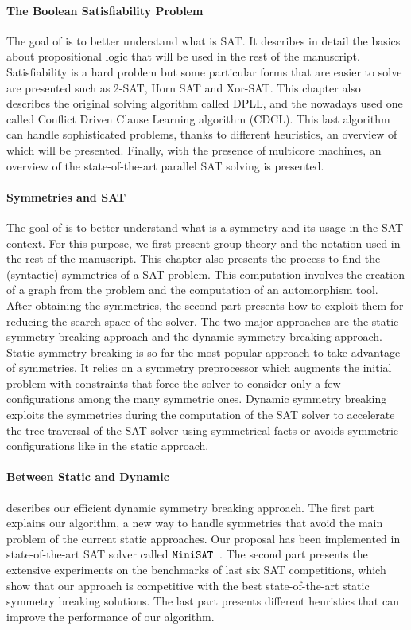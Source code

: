 \paragraph{The Boolean Satisfiability Problem}
The goal of  is to better understand what is SAT. 
It describes in detail the basics
about propositional logic that will be used in the rest of the manuscript. Satisfiability is a hard
problem but some particular forms that are easier to solve are presented such as 2-SAT, Horn SAT and Xor-SAT.
This chapter also describes the original solving algorithm called DPLL, and the
nowadays used one called Conflict Driven Clause Learning algorithm (CDCL).
This last algorithm can handle sophisticated problems, thanks to different heuristics, 
an overview of which will be presented. Finally, with the presence of multicore machines, an overview
 of the state-of-the-art parallel SAT solving is presented.

\paragraph{Symmetries and SAT}
The goal of  is to better understand what is a symmetry and its usage
in the SAT context. For this purpose, we first present group theory and the notation used
in the rest of the manuscript.
This chapter also presents the process to find the (syntactic) symmetries of a SAT problem.
 This computation involves the creation of a graph from the problem and the computation of an
automorphism tool. After obtaining the symmetries, the second part presents how to
exploit them for reducing the search space of the solver. The two major approaches 
are the static symmetry breaking approach and the dynamic symmetry breaking approach.
Static symmetry breaking is so far the most popular approach to take advantage of symmetries. It relies on a symmetry preprocessor which augments the initial problem with constraints that force the solver to consider only a few configurations among the many symmetric ones.
Dynamic symmetry breaking exploits the symmetries during the computation of the SAT solver to accelerate the
tree traversal of the SAT solver using symmetrical facts or avoids symmetric configurations like in the 
static approach.

\paragraph{Between Static and Dynamic}
 describes our efficient dynamic symmetry breaking approach.
The first part explains our algorithm, a new way to handle symmetries that avoid the main problem
of the current static approaches. Our proposal has been implemented in state-of-the-art
SAT solver called $\texttt{MiniSAT}$~\cite{een2003extensible}. The second part presents the extensive experiments on the benchmarks of last six SAT competitions,
which show that our approach is competitive with the best state-of-the-art static symmetry breaking solutions.
The last part presents different heuristics that can improve the performance of our algorithm.

